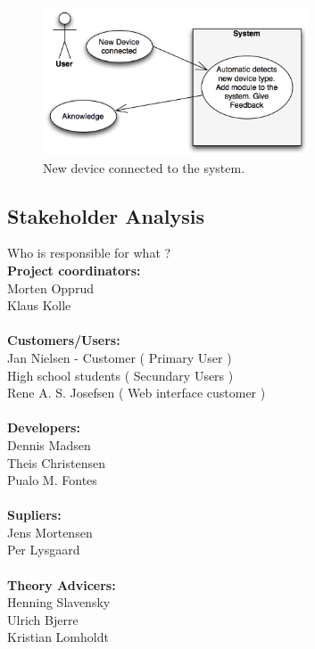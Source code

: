 \begin{figure}[!h]
	\begin{centering}
		\includegraphics[width=0.7\textwidth]{images/usecases2.jpg}
		\caption{New device connected to the system. }
	\end{centering}
\end{figure}
\newpage

\subsection{Stakeholder Analysis}
Who is responsible for what ?\\[0.5cm]
\textbf{Project coordinators:}\\
Morten Opprud\\
Klaus Kolle\\
\\
\textbf{Customers/Users:}\\
Jan Nielsen - Customer ( Primary User )\\
High school students ( Secundary Users )\\
Rene A. S. Josefsen ( Web interface customer )\\
\\
\textbf{Developers:}\\
Dennis Madsen\\
Theis Christensen\\
Pualo M. Fontes\\
\\
\textbf{Supliers:}\\
Jens Mortensen\\
Per Lysgaard\\
\\
\textbf{Theory Advicers:}\\
Henning Slavensky\\
Ulrich Bjerre\\
Kristian Lomholdt\\

